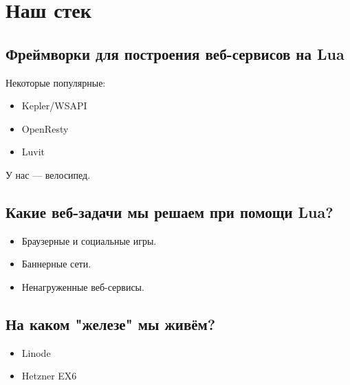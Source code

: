 \documentclass[aspectratio=169,handout,bigger]{beamer}
\begin{document}

\section{Наш стек}


\subsection*{Фреймворки для построения веб-сервисов на Lua}

\begin{frame}
  Некоторые популярные:
  \begin{itemize}
    \item Kepler/WSAPI
    \item OpenResty
    \item Luvit
  \end{itemize}

  У нас — велосипед.
\end{frame}


\subsection*{Какие веб-задачи мы решаем при помощи Lua?}

\begin{frame}
  \begin{itemize}
    \item Браузерные и социальные игры.
    \item Баннерные сети.
    \item Ненагруженные веб-сервисы.
  \end{itemize}
\end{frame}


\subsection*{На каком "железе" мы живём?}

\begin{frame}
  \begin{itemize}
    \item Linode
    \item Hetzner EX6
  \end{itemize}
\end{frame}
\end{document}
